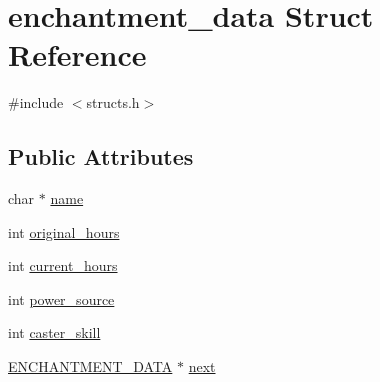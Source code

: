\hypertarget{structenchantment__data}{\section{enchantment\-\_\-data Struct Reference}
\label{structenchantment__data}
}


{\ttfamily \#include $<$structs.\-h$>$}

\subsection*{Public Attributes}
\begin{DoxyCompactItemize}
\item 
char $\ast$ \hyperlink{structenchantment__data_af03b010122f085b92d78729eac4cd7de}{name}
\item 
int \hyperlink{structenchantment__data_a3fba0b973cc533ed7c22ba02e8c98b89}{original\-\_\-hours}
\item 
int \hyperlink{structenchantment__data_a81fcc08acaecc08801af4303e4ced67c}{current\-\_\-hours}
\item 
int \hyperlink{structenchantment__data_a119a19212a52d59675a3f7ea6b886acf}{power\-\_\-source}
\item 
int \hyperlink{structenchantment__data_af49f2d70325ad808a5ce5f2e42395c19}{caster\-\_\-skill}
\item 
\hyperlink{structs_8h_aa9887f2349529f20dd17249da8b9f960}{E\-N\-C\-H\-A\-N\-T\-M\-E\-N\-T\-\_\-\-D\-A\-T\-A} $\ast$ \hyperlink{structenchantment__data_a45b41ecaa85d8cc46da17279e48ed8e1}{next}
\end{DoxyCompactItemize}



